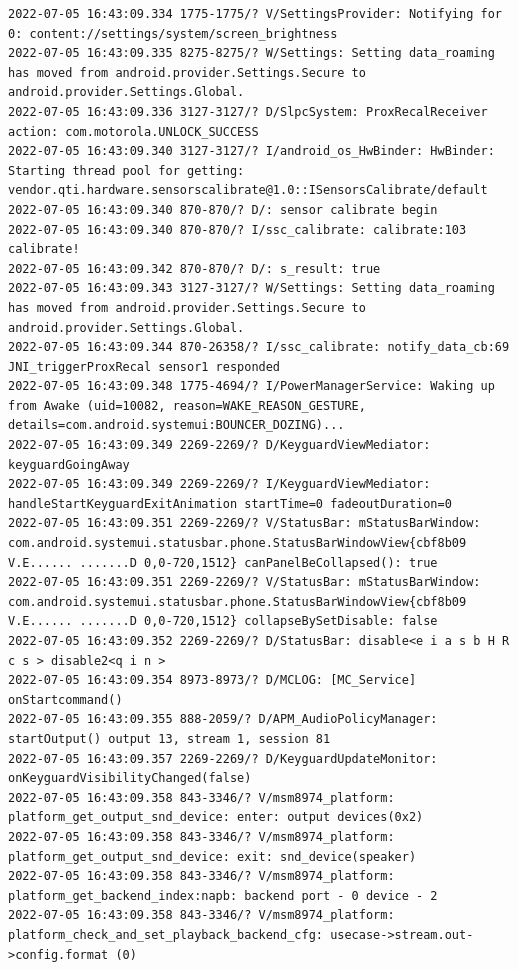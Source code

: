 \documentclass[a4paper,12pt]{book}
\begin{document}
\begin{lstlisting}
2022-07-05 16:43:09.334 1775-1775/? V/SettingsProvider: Notifying for 0: content://settings/system/screen_brightness
2022-07-05 16:43:09.335 8275-8275/? W/Settings: Setting data_roaming has moved from android.provider.Settings.Secure to android.provider.Settings.Global.
2022-07-05 16:43:09.336 3127-3127/? D/SlpcSystem: ProxRecalReceiver action: com.motorola.UNLOCK_SUCCESS
2022-07-05 16:43:09.340 3127-3127/? I/android_os_HwBinder: HwBinder: Starting thread pool for getting: vendor.qti.hardware.sensorscalibrate@1.0::ISensorsCalibrate/default
2022-07-05 16:43:09.340 870-870/? D/: sensor calibrate begin
2022-07-05 16:43:09.340 870-870/? I/ssc_calibrate: calibrate:103 calibrate!
2022-07-05 16:43:09.342 870-870/? D/: s_result: true
2022-07-05 16:43:09.343 3127-3127/? W/Settings: Setting data_roaming has moved from android.provider.Settings.Secure to android.provider.Settings.Global.
2022-07-05 16:43:09.344 870-26358/? I/ssc_calibrate: notify_data_cb:69 JNI_triggerProxRecal sensor1 responded
2022-07-05 16:43:09.348 1775-4694/? I/PowerManagerService: Waking up from Awake (uid=10082, reason=WAKE_REASON_GESTURE, details=com.android.systemui:BOUNCER_DOZING)...
2022-07-05 16:43:09.349 2269-2269/? D/KeyguardViewMediator: keyguardGoingAway
2022-07-05 16:43:09.349 2269-2269/? I/KeyguardViewMediator: handleStartKeyguardExitAnimation startTime=0 fadeoutDuration=0
2022-07-05 16:43:09.351 2269-2269/? V/StatusBar: mStatusBarWindow: com.android.systemui.statusbar.phone.StatusBarWindowView{cbf8b09 V.E...... .......D 0,0-720,1512} canPanelBeCollapsed(): true
2022-07-05 16:43:09.351 2269-2269/? V/StatusBar: mStatusBarWindow: com.android.systemui.statusbar.phone.StatusBarWindowView{cbf8b09 V.E...... .......D 0,0-720,1512} collapseBySetDisable: false
2022-07-05 16:43:09.352 2269-2269/? D/StatusBar: disable<e i a s b H R c s > disable2<q i n >
2022-07-05 16:43:09.354 8973-8973/? D/MCLOG: [MC_Service] onStartcommand()
2022-07-05 16:43:09.355 888-2059/? D/APM_AudioPolicyManager: startOutput() output 13, stream 1, session 81
2022-07-05 16:43:09.357 2269-2269/? D/KeyguardUpdateMonitor: onKeyguardVisibilityChanged(false)
2022-07-05 16:43:09.358 843-3346/? V/msm8974_platform: platform_get_output_snd_device: enter: output devices(0x2)
2022-07-05 16:43:09.358 843-3346/? V/msm8974_platform: platform_get_output_snd_device: exit: snd_device(speaker)
2022-07-05 16:43:09.358 843-3346/? V/msm8974_platform: platform_get_backend_index:napb: backend port - 0 device - 2 
2022-07-05 16:43:09.358 843-3346/? V/msm8974_platform: platform_check_and_set_playback_backend_cfg: usecase->stream.out->config.format (0)

\end{lstlisting}
\end{document}
